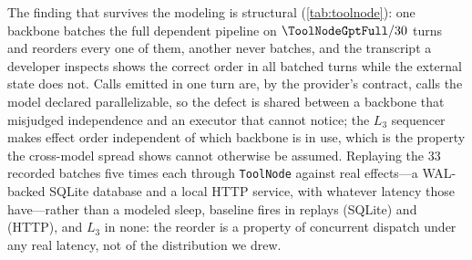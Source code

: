 \begin{table}[t]
\centering
\caption{Model-emitted batches through LangGraph's released \texttt{ToolNode}
(\texttt{langgraph} 1.2.5), $30$ turns per backbone, natural prompt. Tool
latency modeled. \emph{Transcript}: turns in which the returned
\texttt{ToolMessage} list preserved issuance order although effects committed
out of order.}
\label{tab:toolnode}
\footnotesize
\setlength{\tabcolsep}{3pt}
\end{table}

The finding that survives the modeling is structural
(\cref{tab:toolnode}): one backbone batches the full dependent pipeline on
$\ToolNodeGptFull/30$ turns and reorders every one of them, another never
batches, and the transcript a developer inspects shows the correct order in
all \ToolNodeBatchedTurns{} batched turns while the external state does not.
Calls emitted in one turn are, by the provider's contract, calls the model
declared parallelizable, so the defect is shared between a backbone that
misjudged independence and an executor that cannot notice; the $L_3$
sequencer makes effect order independent of which backbone is in use, which
is the property the cross-model spread shows cannot otherwise be assumed.
Replaying the $33$ recorded batches five times each through
\texttt{ToolNode} against real effects---a WAL-backed SQLite database and a
local HTTP service, with whatever latency those have---rather than a modeled
sleep, baseline  fires in \ToolNodeRealSqlite{} replays (SQLite) and
\ToolNodeRealHttp{} (HTTP), and $L_3$ in none: the reorder is a property of
concurrent dispatch under any real latency, not of the distribution we drew.

